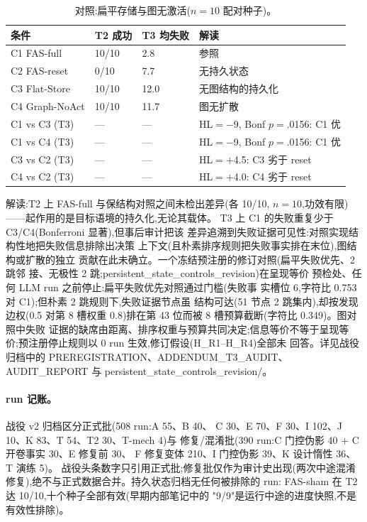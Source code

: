 \documentclass[10pt,a4paper]{ctexart}
\begin{document}
\begin{table}[h]
\centering\small
\caption{对照:扁平存储与图无激活($n{=}10$ 配对种子)。}
\label{tab:s-controls-zh}
\begin{tabular}{L{3.0cm}L{3.0cm}L{3.0cm}L{5.4cm}}
\toprule
\textbf{条件} & \textbf{T2 成功} & \textbf{T3 均失败} & \textbf{解读} \\
\midrule
C1 FAS-full & 10/10 & 2.8 & 参照 \\
C2 FAS-reset & 0/10 & 7.7 & 无持久状态 \\
C3 Flat-Store & 10/10 & 12.0 & 无图结构的持久化 \\
C4 Graph-NoAct & 10/10 & 11.7 & 图无扩散 \\
\midrule
C1 vs C3 (T3) & --- & --- & HL${=}{-}$9, Bonf $p{=}$.0156: C1 优 \\
C1 vs C4 (T3) & --- & --- & HL${=}{-}$9, Bonf $p{=}$.0156: C1 优 \\
C3 vs C2 (T3) & --- & --- & HL${=}{+}$4.5: C3 劣于 reset \\
C4 vs C2 (T3) & --- & --- & HL${=}{+}$4.0: C4 劣于 reset \\
\bottomrule
\end{tabular}
\end{table}

解读:T2 上 FAS-full 与保结构对照之间未检出差异(各 10/10,
$n{=}10$,功效有限)——起作用的是目标语境的持久化,无论其载体。
T3 上 C1 的失败重复少于 C3/C4(Bonferroni 显著),但事后审计把该
差异追溯到失败证据可见性:对照实现结构性地把失败信息排除出决策
上下文(且朴素排序规则把失败事实排在末位),图结构或扩散的独立
贡献在此未确立。一个冻结预注册的修订对照(扁平失败优先、2 跳邻
接、无极性 2 跳;persistent\_state\_controls\_revision)在呈现等价
预检处、任何 LLM run 之前停止:扁平失败优先对照通过门槛(失败事
实槽位 6,字符比 0.753 对 C1);但朴素 2 跳规则下,失败证据节点虽
结构可达(51 节点 2 跳集内),却按发现边权(0.5 对第 8 槽权重
0.8)排在第 43 位而被 8 槽预算截断(字符比 0.349)。图对照中失败
证据的缺席由距离、排序权重与预算共同决定;信息等价不等于呈现等
价;预注册停止规则以 0 run 生效,修订假设(H\_R1--H\_R4)全部未
回答。详见战役归档中的 PREREGISTRATION、ADDENDUM\_T3\_AUDIT、
AUDIT\_REPORT 与 persistent\_state\_controls\_revision/。

\paragraph{run 记账。}战役 v2 归档区分正式批(508 run:A 55、B 40、
C 30、E 70、F 30、I 102、J 10、K 83、T 54、T2 30、T-mech 4)与
修复/混淆批(390 run:C 门控伪影 40 + C 开卷事实 30、E 修复前 30、
F 修复变体 210、I 门控伪影 39、K 设计惰性 36、T 演练 5)。
战役头条数字只引用正式批;修复批仅作为审计史出现(两次中途混淆
修复),绝不与正式数据合并。持久状态归档无任何被排除的 run:
FAS-sham 在 T2 达 10/10,十个种子全部有效(早期内部笔记中的
"9/9"是运行中途的进度快照,不是有效性排除)。
\end{document}
